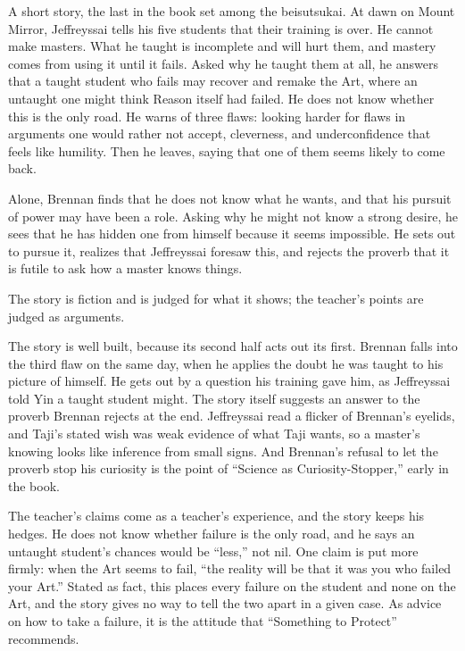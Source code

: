 \begin{afterword}
\summaryhead

A short story, the last in the book set among the beisutsukai. At dawn on Mount Mirror, Jeffreyssai tells his five students that their training is over. He cannot make masters. What he taught is incomplete and will hurt them, and mastery comes from using it until it fails. Asked why he taught them at all, he answers that a taught student who fails may recover and remake the Art, where an untaught one might think Reason itself had failed. He does not know whether this is the only road. He warns of three flaws: looking harder for flaws in arguments one would rather not accept, cleverness, and underconfidence that feels like humility. Then he leaves, saying that one of them seems likely to come back.

Alone, Brennan finds that he does not know what he wants, and that his pursuit of power may have been a role. Asking why he might not know a strong desire, he sees that he has hidden one from himself because it seems impossible. He sets out to pursue it, realizes that Jeffreyssai foresaw this, and rejects the proverb that it is futile to ask how a master knows things.

\responsehead

The story is fiction and is judged for what it shows; the teacher's points are judged as arguments.

The story is well built, because its second half acts out its first. Brennan falls into the third flaw on the same day, when he applies the doubt he was taught to his picture of himself. He gets out by a question his training gave him, as Jeffreyssai told Yin a taught student might. The story itself suggests an answer to the proverb Brennan rejects at the end. Jeffreyssai read a flicker of Brennan's eyelids, and Taji's stated wish was weak evidence of what Taji wants, so a master's knowing looks like inference from small signs. And Brennan's refusal to let the proverb stop his curiosity is the point of ``Science as Curiosity-Stopper,'' early in the book.

The teacher's claims come as a teacher's experience, and the story keeps his hedges. He does not know whether failure is the only road, and he says an untaught student's chances would be ``less,'' not nil. One claim is put more firmly: when the Art seems to fail, ``the reality will be that it was you who failed your Art.'' Stated as fact, this places every failure on the student and none on the Art, and the story gives no way to tell the two apart in a given case. As advice on how to take a failure, it is the attitude that ``Something to Protect'' recommends.


\end{afterword}
